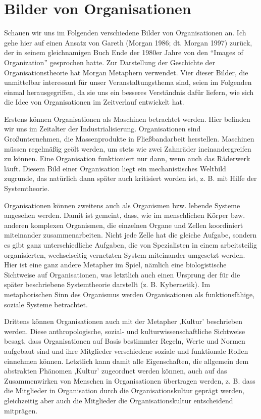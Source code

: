 \documentclass[
  letterpaper,
]{book}
\begin{document}
\section{Bilder von Organisationen}\label{bilder-von-organisationen}

Schauen wir uns im Folgenden verschiedene Bilder von Organisationen an.
Ich gehe hier auf einen Ansatz von Gareth (Morgan 1986; dt. Morgan 1997)
zurück, der in seinem gleichnamigen Buch Ende der 1980er Jahre von den
``Images of Organization'' gesprochen hatte. Zur Darstellung der
Geschichte der Organisationstheorie hat Morgan Metaphern verwendet. Vier
dieser Bilder, die unmittelbar interessant für unser Veranstaltungsthema
sind, seien im Folgenden einmal herausgegriffen, da sie uns ein besseres
Verständnis dafür liefern, wie sich die Idee von Organisationen im
Zeitverlauf entwickelt hat.

Erstens können Organisationen als Maschinen betrachtet werden. Hier
befinden wir uns im Zeitalter der Industrialisierung. Organisationen
sind Großunternehmen, die Massenprodukte in Fließbandarbeit herstellen.
Maschinen müssen regelmäßig geölt werden, um stets wie zwei Zahnräder
ineinandergreifen zu können. Eine Organisation funktioniert nur dann,
wenn auch das Räderwerk läuft. Diesem Bild einer Organisation liegt ein
mechanistisches Weltbild zugrunde, das natürlich dann später auch
kritisiert worden ist, z. B. mit Hilfe der Systemtheorie.

Organisationen können zweitens auch als Organismen bzw. lebende Systeme
angesehen werden. Damit ist gemeint, dass, wie im menschlichen Körper
bzw. anderen komplexen Organismen, die einzelnen Organe und Zellen
koordiniert miteinander zusammenarbeiten. Nicht jede Zelle hat die
gleiche Aufgabe, sondern es gibt ganz unterschiedliche Aufgaben, die von
Spezialisten in einem arbeitsteilig organisierten, wechselseitig
vernetzten System miteinander umgesetzt werden. Hier ist eine ganz
andere Metapher im Spiel, nämlich eine biologistische Sichtweise auf
Organisationen, was letztlich auch einen Ursprung der für die später
beschriebene Systemtheorie darstellt (z. B. Kybernetik). Im
metaphorischen Sinn des Organismus werden Organisationen als
funktionsfähige, soziale Systeme betrachtet.

Drittens können Organisationen auch mit der Metapher ‚Kultur'
beschrieben werden. Diese anthropologische, sozial- und
kulturwissenschaftliche Sichtweise besagt, dass Organisationen auf Basis
bestimmter Regeln, Werte und Normen aufgebaut sind und ihre Mitglieder
verschiedene soziale und funktionale Rollen einnehmen können. Letztlich
kann damit alle Eigenschaften, die allgemein dem abstrakten Phänomen
‚Kultur' zugeordnet werden können, auch auf das Zusammenwirken von
Menschen in Organisationen übertragen werden, z. B. dass die Mitglieder
in Organisation durch die Organisationskultur geprägt werden,
gleichzeitig aber auch die Mitglieder die Organisationskultur
entscheidend mitprägen.
\end{document}
